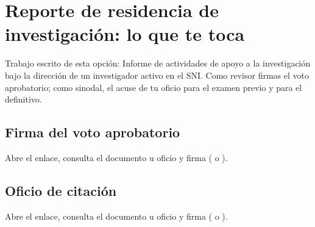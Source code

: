 \section{Reporte de residencia de investigación: lo que te toca}
Trabajo escrito de esta opción: Informe de actividades de apoyo a la investigación bajo la dirección de un investigador activo en el SNI. Como revisor firmas el voto aprobatorio; como sinodal, el acuse de tu oficio para el examen previo y para el definitivo.
\subsection{Firma del voto aprobatorio}
Abre el enlace, consulta el documento u oficio y firma ( o ).
\subsection{Oficio de citación}
Abre el enlace, consulta el documento u oficio y firma ( o ).
